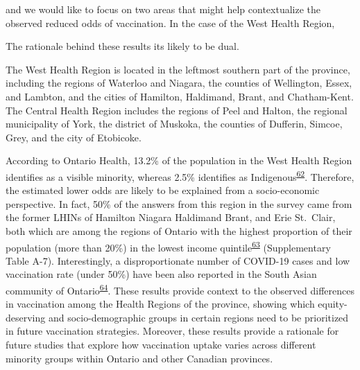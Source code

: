 \documentclass[
  letterpaper,
  DIV=11,
  numbers=noendperiod]{scrartcl}
\begin{document}
and we would like to focus on two areas that might help contextualize
the observed reduced odds of vaccination. In the case of the West Health
Region,

The rationale behind these results its likely to be dual.

The West Health Region is located in the leftmost southern part of the
province, including the regions of Waterloo and Niagara, the counties of
Wellington, Essex, and Lambton, and the cities of Hamilton, Haldimand,
Brant, and Chatham-Kent. The Central Health Region includes the regions
of Peel and Halton, the regional municipality of York, the district of
Muskoka, the counties of Dufferin, Simcoe, Grey, and the city of
Etobicoke.

According to Ontario Health, 13.2\% of the population in the West Health
Region identifies as a visible minority, whereas 2.5\% identifies as
Indigenous\textsuperscript{\protect\hyperlink{ref-ontariohealth}{62}}.
Therefore, the estimated lower odds are likely to be explained from a
socio-economic perspective. In fact, 50\% of the answers from this
region in the survey came from the former LHINs of Hamilton Niagara
Haldimand Brant, and Erie St.~Clair, both which are among the regions of
Ontario with the highest proportion of their population (more than 20\%)
in the lowest income
quintile\textsuperscript{\protect\hyperlink{ref-buajitti2018}{63}}
(Supplementary Table A-7). Interestingly, a disproportionate number of
COVID-19 cases and low vaccination rate (under 50\%) have been also
reported in the South Asian community of
Ontario\textsuperscript{\protect\hyperlink{ref-anand2022}{64}}. These
results provide context to the observed differences in vaccination among
the Health Regions of the province, showing which equity-deserving and
socio-demographic groups in certain regions need to be prioritized in
future vaccination strategies. Moreover, these results provide a
rationale for future studies that explore how vaccination uptake varies
across different minority groups within Ontario and other Canadian
provinces.
\end{document}
